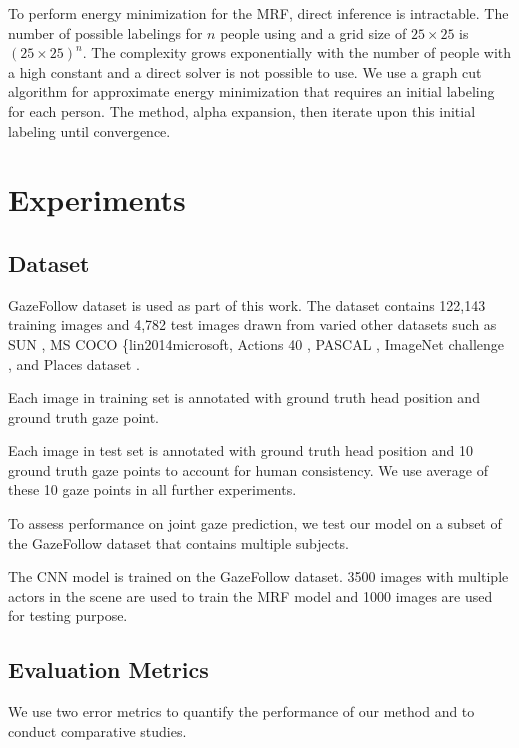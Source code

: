 \documentclass[10pt,twocolumn,letterpaper]{article}
\begin{document}
To perform energy minimization for the MRF, direct inference is intractable. The number of possible labelings for $n$ people using and a grid size of $25 \times 25$ is $ (25 \times 25)^n$. The complexity grows exponentially with the number of people with a high constant and a direct solver is not possible to use. We use a graph cut algorithm \cite{boykov2001fast} for approximate energy minimization that requires an initial labeling for each person. The method, alpha expansion, then iterate upon this initial labeling until convergence.

\section{Experiments}

\subsection{Dataset}

GazeFollow dataset \cite{nips15_recasens} is used as part of this work. The dataset contains 122,143 training images and 4,782 test images drawn from varied other datasets such as SUN \cite{xiao2010sun}, MS COCO \{lin2014microsoft, Actions 40 \cite{yao2011human}, PASCAL \cite{everingham2010pascal}, ImageNet challenge \cite{russakovsky2015imagenet}, and Places dataset \cite{zhou2014learning}.

Each image in training set is annotated with ground truth head position and ground truth gaze point.

Each image in test set is annotated with ground truth head position and 10 ground truth gaze points to account for human consistency. We use average of these 10 gaze points in all further experiments.

To assess performance on joint gaze prediction, we test our model on a subset of the GazeFollow dataset that contains multiple subjects.

The CNN model \cite{nips15_recasens} is trained on the GazeFollow dataset. 3500 images with multiple actors in the scene are used to train the MRF model and 1000 images are used for testing purpose.

\subsection{Evaluation Metrics}

We use two error metrics to quantify the performance of our method and to conduct comparative studies.
\end{document}
